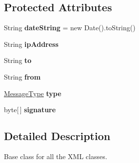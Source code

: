 \subsection*{Protected Attributes}
\begin{DoxyCompactItemize}
\item 
\hypertarget{classgov_1_1fnal_1_1ppd_1_1dd_1_1xml_1_1EnhancedEncodedCarrier_a7b650b74cc2f02c6dc7e0d958b475bf5}{String {\bfseries date\-String} = new Date().to\-String()}\label{classgov_1_1fnal_1_1ppd_1_1dd_1_1xml_1_1EnhancedEncodedCarrier_a7b650b74cc2f02c6dc7e0d958b475bf5}

\item 
\hypertarget{classgov_1_1fnal_1_1ppd_1_1dd_1_1xml_1_1EnhancedEncodedCarrier_ab0c8e959c116e523036f01c2cfeeffc3}{String {\bfseries ip\-Address}}\label{classgov_1_1fnal_1_1ppd_1_1dd_1_1xml_1_1EnhancedEncodedCarrier_ab0c8e959c116e523036f01c2cfeeffc3}

\item 
\hypertarget{classgov_1_1fnal_1_1ppd_1_1dd_1_1xml_1_1EnhancedEncodedCarrier_ae7988454d63de8af193c5281f561c8d7}{String {\bfseries to}}\label{classgov_1_1fnal_1_1ppd_1_1dd_1_1xml_1_1EnhancedEncodedCarrier_ae7988454d63de8af193c5281f561c8d7}

\item 
\hypertarget{classgov_1_1fnal_1_1ppd_1_1dd_1_1xml_1_1EnhancedEncodedCarrier_a6d0c2ae50a1863575e7652724e9c23f3}{String {\bfseries from}}\label{classgov_1_1fnal_1_1ppd_1_1dd_1_1xml_1_1EnhancedEncodedCarrier_a6d0c2ae50a1863575e7652724e9c23f3}

\item 
\hypertarget{classgov_1_1fnal_1_1ppd_1_1dd_1_1xml_1_1EnhancedEncodedCarrier_a1956e27a9e9bad7fe20b1eb862f1f754}{\hyperlink{enumgov_1_1fnal_1_1ppd_1_1dd_1_1chat_1_1MessageType}{Message\-Type} {\bfseries type}}\label{classgov_1_1fnal_1_1ppd_1_1dd_1_1xml_1_1EnhancedEncodedCarrier_a1956e27a9e9bad7fe20b1eb862f1f754}

\item 
\hypertarget{classgov_1_1fnal_1_1ppd_1_1dd_1_1xml_1_1EnhancedEncodedCarrier_aeb7c857e197c2d52875e8fbe946cd643}{byte\mbox{[}$\,$\mbox{]} {\bfseries signature}}\label{classgov_1_1fnal_1_1ppd_1_1dd_1_1xml_1_1EnhancedEncodedCarrier_aeb7c857e197c2d52875e8fbe946cd643}

\end{DoxyCompactItemize}


\subsection{Detailed Description}
Base class for all the X\-M\-L classes.

